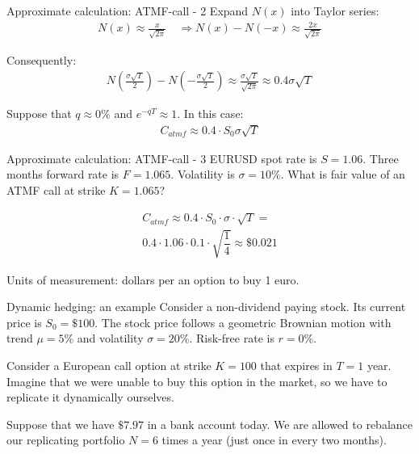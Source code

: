 \documentclass{beamer}
\begin{document}
\begin{frame}{Approximate calculation: ATMF-call - 2}
\justify
Expand $N(x)$ into Taylor series:
\begin{align*}
N(x) \approx \frac{x}{\sqrt{2\pi}} \quad \Rightarrow
N(x) - N(-x) \approx \frac{2x}{\sqrt{2\pi}}
\end{align*}

Consequently:
\begin{align*}
N\left(\frac{\sigma \sqrt{T}}{2}\right) - N\left(-\frac{\sigma \sqrt{T}}{2}\right)
\approx
\frac{\sigma\sqrt{T}}{\sqrt{2\pi}}
\approx
0.4\sigma\sqrt{T}
\end{align*}

Suppose that $q\approx 0\%$ and $e^{-qT} \approx 1$. In this case:
\begin{align*}
C_{atmf} \approx 0.4 \cdot S_0 \sigma \sqrt{T}
\end{align*}
\end{frame}



\begin{frame}{Approximate calculation: ATMF-call - 3}
\justify
EURUSD spot rate is $S=1.06$. Three months forward rate is $F=1.065$. Volatility is $\sigma=10\%$. What is fair value of an ATMF call at strike $K=1.065$?

\begin{align*}
C_{atmf} \approx 0.4 \cdot S_0 \cdot \sigma \cdot \sqrt{T} = \\
0.4 \cdot 1.06 \cdot 0.1 \cdot \sqrt{\dfrac{1}{4}} \approx \$0.021
\end{align*}

Units of measurement: dollars per an option to buy 1 euro.
\end{frame}



\begin{frame}{Dynamic hedging: an example}
\justify
Consider a non-dividend paying stock. Its current price is $S_0=\$100$. The stock price follows a geometric Brownian motion with trend $\mu=5\%$ and volatility $\sigma=20\%$. Risk-free rate is $r=0\%$.

\justify
Consider a European call option at strike $K=100$ that expires in $T=1$ year. Imagine that we were unable to buy this option in the market, so we have to replicate it dynamically ourselves.

\justify
Suppose that we have $\$7.97$ in  a bank account today. We are allowed to rebalance our replicating portfolio $N=6$ times a year (just once in every two months).
\end{frame}
\end{document}
